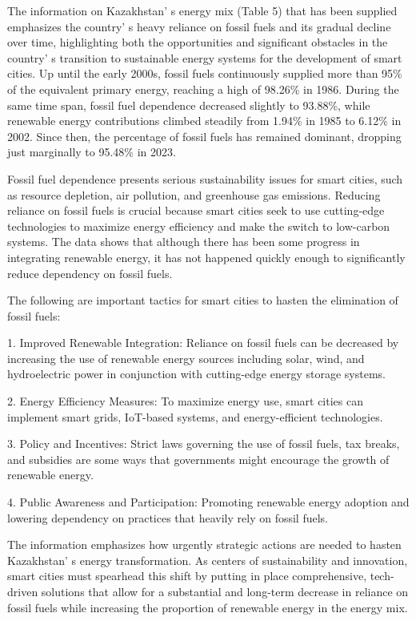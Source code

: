 \begin{multicols}{2}
The information on Kazakhstan' s energy mix (Table 5)
that has been supplied emphasizes the country' s heavy
reliance on fossil fuels and its gradual decline over time, highlighting
both the opportunities and significant obstacles in the
country' s transition to sustainable energy systems for
the development of smart cities. Up until the early 2000s, fossil fuels
continuously supplied more than 95\% of the equivalent primary energy,
reaching a high of 98.26\% in 1986. During the same time span, fossil
fuel dependence decreased slightly to 93.88\%, while renewable energy
contributions climbed steadily from 1.94\% in 1985 to 6.12\% in 2002.
Since then, the percentage of fossil fuels has remained dominant,
dropping just marginally to 95.48\% in 2023.

Fossil fuel dependence presents serious sustainability issues for smart
cities, such as resource depletion, air pollution, and greenhouse gas
emissions. Reducing reliance on fossil fuels is crucial because smart
cities seek to use cutting-edge technologies to maximize energy
efficiency and make the switch to low-carbon systems. The data shows
that although there has been some progress in integrating renewable
energy, it has not happened quickly enough to significantly reduce
dependency on fossil fuels.

The following are important tactics for smart cities to hasten the
elimination of fossil fuels:

1. Improved Renewable Integration: Reliance on fossil fuels can be
decreased by increasing the use of renewable energy sources including
solar, wind, and hydroelectric power in conjunction with cutting-edge
energy storage systems.

2. Energy Efficiency Measures: To maximize energy use, smart cities can
implement smart grids, IoT-based systems, and energy-efficient
technologies.

3. Policy and Incentives: Strict laws governing the use of fossil fuels,
tax breaks, and subsidies are some ways that governments might
encourage the growth of renewable energy.

4. Public Awareness and Participation: Promoting renewable energy
adoption and lowering dependency on practices that heavily rely on
fossil fuels.

The information emphasizes how urgently strategic actions are needed to
hasten Kazakhstan' s energy transformation. As centers of
sustainability and innovation, smart cities must spearhead this shift by
putting in place comprehensive, tech-driven solutions that allow for a
substantial and long-term decrease in reliance on fossil fuels while
increasing the proportion of renewable energy in the energy mix.


\end{multicols}
